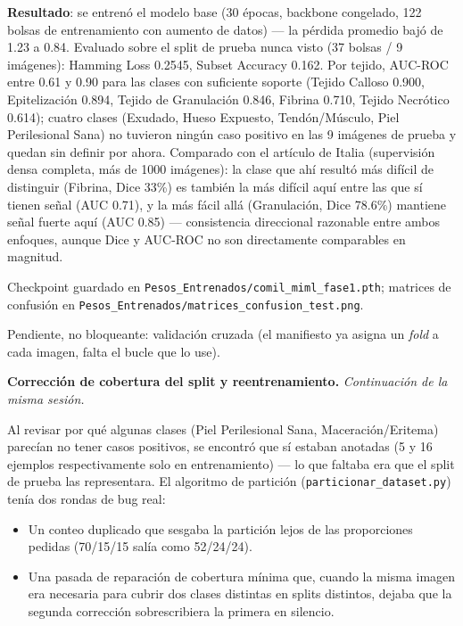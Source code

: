\documentclass[12pt,letterpaper]{report}
\newcommand{\entrada}[2]{%
    \vspace{0.6em}
    \noindent\textbf{#1.} \textit{#2}
    \vspace{0.3em}
    \par
}
\begin{document}
\textbf{Resultado}: se entrenó el modelo base (30 épocas, backbone congelado, 122 bolsas de
entrenamiento con aumento de datos) --- la pérdida promedio bajó de 1.23 a 0.84. Evaluado sobre el
split de prueba nunca visto (37 bolsas / 9 imágenes): Hamming Loss 0.2545, Subset Accuracy 0.162.
Por tejido, AUC-ROC entre 0.61 y 0.90 para las clases con suficiente soporte (Tejido Calloso 0.900,
Epitelización 0.894, Tejido de Granulación 0.846, Fibrina 0.710, Tejido Necrótico 0.614); cuatro
clases (Exudado, Hueso Expuesto, Tendón/Músculo, Piel Perilesional Sana) no tuvieron ningún caso
positivo en las 9 imágenes de prueba y quedan sin definir por ahora. Comparado con el artículo de
Italia (supervisión densa completa, más de 1000 imágenes): la clase que ahí resultó más difícil de
distinguir (Fibrina, Dice 33\%) es también la más difícil aquí entre las que sí tienen señal (AUC
0.71), y la más fácil allá (Granulación, Dice 78.6\%) mantiene señal fuerte aquí (AUC 0.85) ---
consistencia direccional razonable entre ambos enfoques, aunque Dice y AUC-ROC no son directamente
comparables en magnitud.

Checkpoint guardado en \texttt{Pesos\_Entrenados/comil\_miml\_fase1.pth}; matrices de confusión en
\texttt{Pesos\_Entrenados/matrices\_confusion\_test.png}.

Pendiente, no bloqueante: validación cruzada (el manifiesto ya asigna un \emph{fold} a cada imagen,
falta el bucle que lo use).

\entrada{Corrección de cobertura del split y reentrenamiento}{Continuación de la misma sesión.}

Al revisar por qué algunas clases (Piel Perilesional Sana, Maceración/Eritema) parecían no tener
casos positivos, se encontró que sí estaban anotadas (5 y 16 ejemplos respectivamente solo en
entrenamiento) --- lo que faltaba era que el split de prueba las representara. El algoritmo de
partición (\texttt{particionar\_dataset.py}) tenía dos rondas de bug real:

\begin{itemize}[leftmargin=1.5em]
    \item Un conteo duplicado que sesgaba la partición lejos de las proporciones pedidas (70/15/15
        salía como 52/24/24).
    \item Una pasada de reparación de cobertura mínima que, cuando la misma imagen era necesaria
        para cubrir dos clases distintas en splits distintos, dejaba que la segunda corrección
        sobrescribiera la primera en silencio.
\end{itemize}
\end{document}
